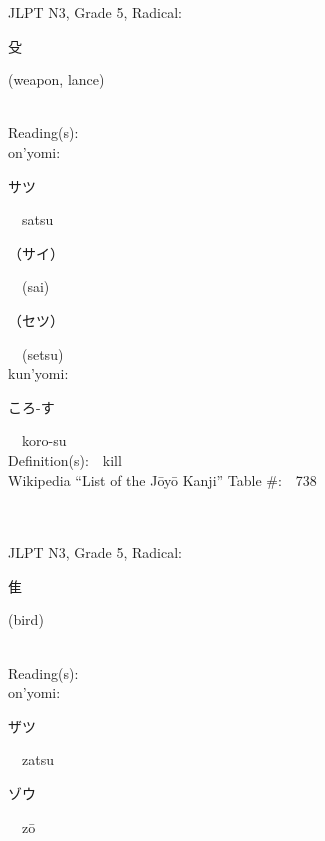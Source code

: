\begin{multicols}{2}
{JLPT N3, Grade 5, Radical:\ \ {\begin{CJK}{UTF8}{min} 殳 \end{CJK}} (weapon, lance) } \\
Reading(s):\ \ \\
{\hspace*{1em}}on'yomi:\ \ \\
{\hspace*{2em}}{\begin{CJK}{UTF8}{min} サツ \end{CJK}}\ \ satsu\ \ \\
{\hspace*{2em}}{\begin{CJK}{UTF8}{min} （サイ） \end{CJK}}\ \ (sai)\ \ \\
{\hspace*{2em}}{\begin{CJK}{UTF8}{min} （セツ） \end{CJK}}\ \ (setsu)\ \ \\
{\hspace*{1em}}kun'yomi:\ \ \\
{\hspace*{2em}}{\begin{CJK}{UTF8}{min} ころ-す \end{CJK}}\ \ koro-su\ \ \\
Definition(s):\ \ kill \\
Wikipedia ``List of the J\=oy\=o Kanji'' Table \#:\ \ 738 \\
\ \ \\
{\fontsize{34pt}{40pt}  }\ \ \\  %
{JLPT N3, Grade 5, Radical:\ \ {\begin{CJK}{UTF8}{min} 隹 \end{CJK}} (bird) } \\
Reading(s):\ \ \\
{\hspace*{1em}}on'yomi:\ \ \\
{\hspace*{2em}}{\begin{CJK}{UTF8}{min} ザツ \end{CJK}}\ \ zatsu\ \ \\
{\hspace*{2em}}{\begin{CJK}{UTF8}{min} ゾウ \end{CJK}}\ \ z\=o\ \ \\

\end{multicols}
